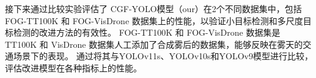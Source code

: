 



接下来通过比较实验评估了 CGF-YOLO模型（our）在2个不同数据集中，包括 FOG-TT100K 和 FOG-VisDrone 数据集上的性能，以验证小目标检测和多尺度目标检测的改进方法的有效性。
FOG-TT100K 和 FOG-VisDrone 数据集是 TT100K 和 VisDrone 数据集人工添加了合成雾后的数据集，能够反映在雾天的交通场景下的表现。
通过将其与YOLOv11s、YOLOv10s和YOLOv9模型进行比较，评估改进模型在各种指标上的性能。

